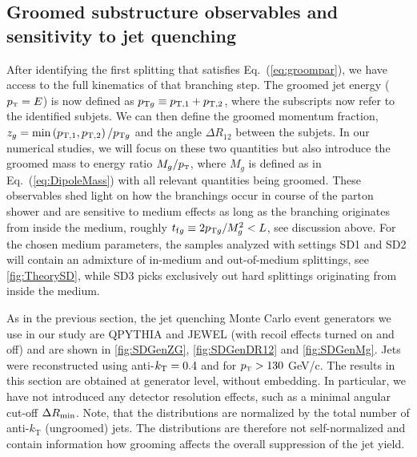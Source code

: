 \subsection{Groomed substructure observables and sensitivity to jet quenching}
\label{sec:groomedobservables}

After identifying the first splitting that satisfies Eq.~(\ref{eq:groompar}), we have access to the full kinematics of that branching step. The groomed jet energy ($p_{\text{\tiny T}} = E$) is now defined as $p_{{\rm \tiny T} g} \equiv p_{\mathrm{T},1}+p_{\mathrm{T},2}$, where the subscripts now refer to the identified subjets. We can then define the groomed momentum fraction, $z_g = \min \left(p_{{\rm \tiny T},1},p_{{\rm \tiny T},2}\right)/p_{{\rm \tiny T}g}$ and the angle $\Delta R_{12}$ between the subjets. In our numerical studies, we will focus on these two quantities but also introduce the groomed mass to energy ratio $M_g/p_{\text{\tiny T}}$, where $M_g$ is defined as in Eq.~(\ref{eq:DipoleMass}) with all relevant quantities being groomed. These observables shed light on how the branchings occur in course of the parton shower and are sensitive to medium effects as long as the branching originates from inside the medium, roughly $ t_{{\rm f}g}\equiv 2 p_{{\rm \tiny T}g}/M_g^2 < L$, see discussion above. For the chosen medium parameters, the samples analyzed with settings SD1 and SD2 will contain an admixture of in-medium and out-of-medium splittings, see \autoref{fig:TheorySD}, while SD3 picks exclusively out hard splittings originating from inside the medium. 

As in the previous section, the jet quenching Monte Carlo event generators we use in our study are QPYTHIA and JEWEL (with recoil effects turned on and off) and are shown in \autoref{fig:SDGenZG}, \ref{fig:SDGenDR12} and \ref{fig:SDGenMg}. Jets were reconstructed using anti-$k_{\rm \tiny T}=0.4$ and for $p_{\text{\tiny T}} > 130$ GeV/c. 
The results in this section are obtained at generator level, without embedding. In particular, we have not introduced any detector resolution effects, such as a minimal angular cut-off $\Delta R_{\rm min}$.
Note, that the distributions are normalized by the total number of anti-$k_{\text{T}}$ (ungroomed) jets. The distributions are therefore not self-normalized and contain information how grooming affects the overall suppression of the jet yield. 

